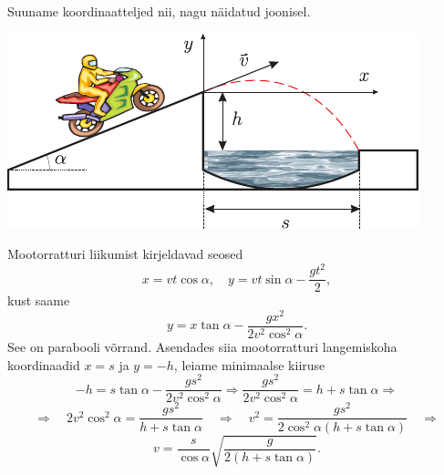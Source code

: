 \documentclass[10pt, twoside]{article}
\begin{document}
{%

\solu
Suuname koordinaatteljed nii, nagu näidatud joonisel.

\begin{center}
	\includegraphics[width=0.8\linewidth]{2007-lahg-05-lah}
\end{center}

Mootorratturi liikumist kirjeldavad seosed
\[
x=v t \cos \alpha, \quad y=v t \sin \alpha-\frac{g t^{2}}{2},
\]
kust saame
\[
y=x \tan \alpha-\frac{g x^{2}}{2 v^{2} \cos ^{2} \alpha}.
\]
See on parabooli võrrand. Asendades siia mootorratturi langemiskoha koordinaadid $x = s$ ja $y = -h$, leiame minimaalse kiiruse
\[
-h=s \tan \alpha-\frac{g s^{2}}{2 v^{2} \cos ^{2} \alpha} \Rightarrow \frac{g s^{2}}{2 v^{2} \cos ^{2} \alpha}=h+s \tan \alpha \Rightarrow
\]
\[
\Rightarrow \quad 2 v^{2} \cos ^{2} \alpha=\frac{g s^{2}}{h+s \tan \alpha} \quad \Rightarrow \quad v^{2}=\frac{g s^{2}}{2 \cos ^{2} \alpha(h+s \tan \alpha)} \quad \Rightarrow
\]
\[
v=\frac{s}{\cos \alpha} \sqrt{\frac{g}{2(h+s \tan \alpha)}}.
\]
\probend
\bigskip


}
\end{document}
